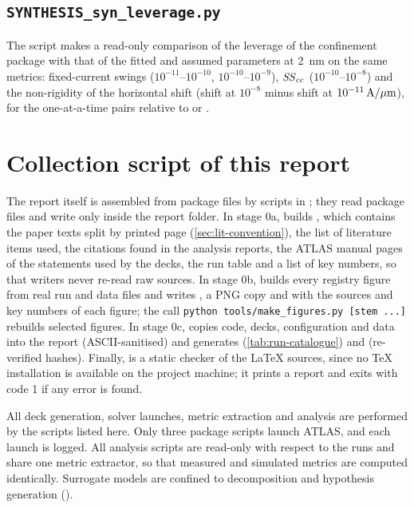 \subsection{\texttt{SYNTHESIS\_syn\_leverage.py}}
The script makes a read-only comparison of the leverage of the confinement package with that of the fitted and assumed
parameters at \SI{2}{nm} on the same metrics: fixed-current swings ($10^{-11}$--$10^{-10}$, $10^{-10}$--$10^{-9}$),
$\mathit{SS}_{\mathrm{cc}}$ ($10^{-10}$--$10^{-8}$) and the non-rigidity of the horizontal shift (shift at $10^{-8}$ minus shift at
$10^{-11}\,\mathrm{A}/\mu\mathrm{m}$), for the one-at-a-time pairs relative to  or .


\section{Collection script of this report}\label{sec:code-collect}

The report itself is assembled from package files by scripts in ; they read package files and write
only inside the report folder. In stage 0a,  builds , which contains the
paper texts split by printed page (\cref{sec:lit-convention}), the list of literature items used, the citations found in
the analysis reports, the ATLAS manual pages of the statements used by the decks, the run table 
and a list of key numbers, so that writers never re-read raw sources. In stage 0b,  builds
every registry figure from real run and data files and writes , a PNG copy and
 with the sources and key numbers of each figure; the call
\texttt{python tools/make\_figures.py [stem ...]} rebuilds selected figures. In stage 0c,
 copies code, decks, configuration and data into the report (ASCII-sanitised) and
generates  (\cref{tab:run-catalogue}) and 
(re-verified hashes). Finally,  is a static checker of the \LaTeX{} sources, since no TeX
installation is available on the project machine; it prints a report and exits with code 1 if any error is found.

\begin{keyresult}
All deck generation, solver launches, metric extraction and analysis are performed by the scripts listed here. Only three
package scripts launch ATLAS, and each launch is logged. All analysis scripts are read-only with respect to the runs and
share one metric extractor, so that measured and simulated metrics are computed identically. Surrogate models are
confined to decomposition and hypothesis generation (\evSURR).
\end{keyresult}
